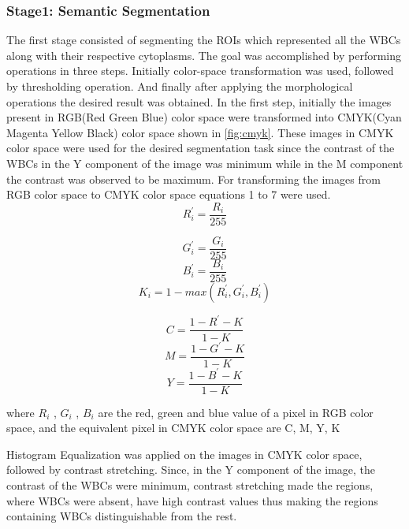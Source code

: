 \documentclass[conference]{IEEEtran}
\begin{document}
\subsubsection{Stage1: Semantic Segmentation}
The first stage consisted of segmenting the ROIs which represented all the WBCs along with their respective cytoplasms. The goal was accomplished
by performing operations in three steps. Initially color-space transformation was used, followed by thresholding operation. And finally after applying the morphological operations the desired result was obtained. In the first step, initially the images present in RGB(Red Green Blue) color space were transformed into CMYK(Cyan Magenta Yellow Black) color space shown in \ref{fig:cmyk}. These images in CMYK color space were used for the desired segmentation task since the contrast of the WBCs in the Y component of the image was minimum while in the M component the contrast was observed to be maximum. For transforming the images from RGB color space to CMYK color space equations 1 to 7 were used. 
\begin{equation}
R_{i}^{'} = \frac{R_{i}}{255}
\end{equation}

\begin{equation}
G_{i}^{'} = \frac{G_{i}}{255}
\end{equation}
\begin{equation}
B_{i}^{'} = \frac{B_{i}}{255}
\end{equation}
\begin{equation}
K_{i} = 1 - max(R_{i}^{'},G_{i}^{'},B_{i}^{'})
\end{equation}

\begin{equation}
C = \frac{1-R^{'} - K}{1-K}
\end{equation}
\begin{equation}
M = \frac{1-G^{'} - K}{1-K}
\end{equation}
\begin{equation}
Y = \frac{1-B^{'} - K}{1-K}
\end{equation}

where $R_{i}$ , $G_{i}$ , $B_{i}$
are the red, green and blue value of a pixel in RGB color space, and the  equivalent pixel in CMYK color space are C, M, Y, K

Histogram Equalization was applied on the images in CMYK color space, followed by contrast stretching. Since, in the Y component of the image, the contrast of the WBCs were minimum, contrast stretching made the regions, where WBCs were absent, have high contrast values thus making the regions containing WBCs distinguishable from the  rest. 
\end{document}
